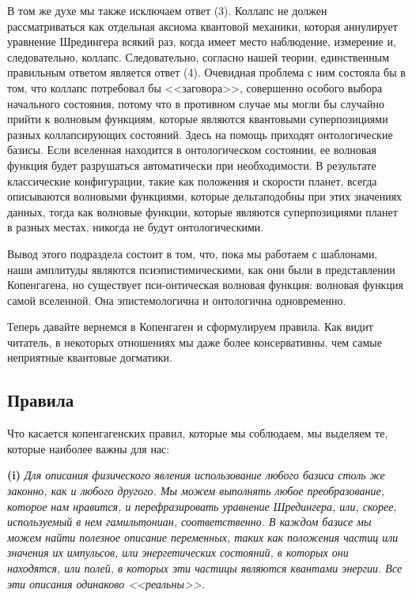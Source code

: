 \documentclass[main.tex]{subfiles}
\begin{document}
В том же духе мы также исключаем ответ (3). Коллапс не должен рассматриваться как отдельная аксиома квантовой механики, которая аннулирует уравнение Шредингера всякий раз, когда имеет место наблюдение, измерение и, следовательно, коллапс. Следовательно, согласно нашей теории, единственным правильным ответом является ответ (4). Очевидная проблема с ним состояла бы в том, что коллапс потребовал бы <<заговора>>, совершенно особого выбора начального состояния, потому что в противном случае мы могли бы случайно прийти к волновым функциям, которые являются квантовыми суперпозициями разных коллапсирующих состояний. Здесь на помощь приходят онтологические базисы. Если вселенная находится в онтологическом состоянии, ее волновая функция будет разрушаться автоматически при необходимости. В результате классические конфигурации, такие как положения и скорости планет, всегда описываются волновыми функциями, которые дельтаподобны при этих значениях данных, тогда как волновые функции, которые являются суперпозициями планет в разных местах, никогда не будут онтологическими.

Вывод этого подраздела состоит в том, что, пока мы работаем с шаблонами, наши амплитуды являются псиэпистимическими, как они были в представлении Копенгагена, но существует пси-онтическая волновая функция: волновая функция самой вселенной. Она эпистемологична и онтологична одновременно.

Теперь давайте вернемся в Копенгаген и сформулируем правила. Как видит читатель, в некоторых отношениях мы даже более консервативны, чем самые неприятные квантовые догматики.

\subsection{Правила}\label{ch5.4}

Что касается копенгагенских правил, которые мы соблюдаем, мы выделяем те, которые наиболее важны для нас:

\textbf{(i)} {\it Для описания физического явления использование любого базиса столь же законно, как и любого другого. Мы можем выполнять любое преобразование, которое нам нравится, и перефразировать уравнение Шредингера, или, скорее, используемый в нем гамильтониан, соответственно. В каждом базисе мы можем найти полезное описание переменных, таких как положения частиц или значения их импульсов, или энергетических состояний, в которых они находятся, или полей, в которых эти частицы являются квантами энергии. Все эти описания одинаково <<реальны>>.}
\end{document}
